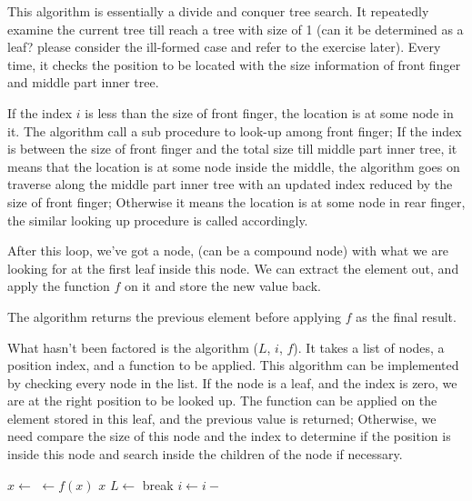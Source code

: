 \documentclass[b5paper]{article}
\begin{document}
This algorithm is essentially a divide and conquer tree search. It repeatedly
examine the current tree till reach a tree with size of 1 (can it be determined
as a leaf? please consider the ill-formed case and refer to the exercise later).
Every time, it checks the position to be located with the size information of
front finger and middle part inner tree.

If the index $i$ is less than the size of front finger, the location is at some
node in it. The algorithm call a sub procedure to look-up among front finger;
If the index is between the size of front finger and the total size till middle
part inner tree, it means that the location is at some node inside the middle,
the algorithm goes on traverse along the middle part inner tree with an updated
index reduced by the size of front finger; Otherwise
it means the location is at some node in rear finger, the similar looking up
procedure is called accordingly.

After this loop, we've got a node, (can be a compound node)
with what we are looking for at the first leaf inside this node. We can extract
the element out, and apply the function $f$ on it and store the new value back.

The algorithm returns the previous element before applying $f$ as the final result.

What hasn't been factored is the algorithm ($L$, $i$, $f$).
It takes a list of nodes, a position index, and a function to be applied. This
algorithm can be implemented by checking every node in the list. If the node
is a leaf, and the index is zero, we are at the right position to be looked up.
The function can be applied on the element stored in this leaf, and the previous
value is returned; Otherwise, we need compare the size of this node and
the index to determine if the position is inside this node and search inside the
children of the node if necessary.

\begin{algorithmic}
  \Loop
        \State $x \gets $ 
        \State {} $\gets f(x)$
        \State \Return $x$
      \EndIf
        \State $L \gets $ 
        \State break
      \EndIf
      \State $i \gets i - $ 
    \EndFor
  \EndLoop
\EndFunction
\end{algorithmic}
\end{document}
